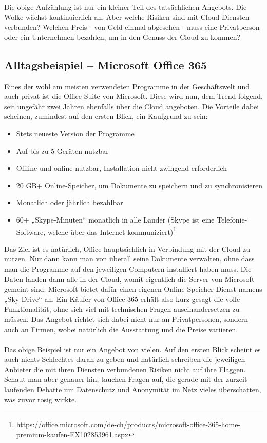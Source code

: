 Die obige Aufzählung ist nur ein kleiner Teil des tatsächlichen Angebots. Die Wolke wächst kontinuierlich an. Aber welche Risiken sind mit Cloud-Diensten verbunden? Welchen Preis - von Geld einmal abgesehen - muss eine Privatperson oder ein Unternehmen bezahlen, um in den Genuss der Cloud zu kommen?

\subsection{Alltagsbeispiel – Microsoft Office 365}
Eines der wohl am meisten verwendeten Programme in der Geschäftswelt und auch privat ist die Office Suite von Microsoft. Diese wird nun, dem Trend folgend, seit ungefähr zwei Jahren ebenfalls über die Cloud angeboten. Die Vorteile dabei scheinen, zumindest auf den ersten Blick, ein Kaufgrund zu sein:

\begin{itemize}
\item Stets neueste Version der Programme
\item Auf bis zu 5 Geräten nutzbar
\item Offline und online nutzbar, Installation nicht zwingend erforderlich
\item 20 GB+ Online-Speicher, um Dokumente zu speichern und zu synchronisieren
\item Monatlich oder jährlich bezahlbar
\item 60+ „Skype-Minuten“ monatlich in alle Länder (Skype ist eine Telefonie-Software, welche über das Internet kommuniziert)\footnote{\url{https://office.microsoft.com/de-ch/products/microsoft-office-365-home-premium-kaufen-FX102853961.aspx}}
\end{itemize}

Das Ziel ist es natürlich, Office hauptsächlich in Verbindung mit der Cloud zu nutzen. Nur dann kann man von überall seine Dokumente verwalten, ohne dass man die Programme auf den jeweiligen Computern installiert haben muss. Die Daten landen dann alle in der Cloud, womit eigentlich die Server von Microsoft gemeint sind. Microsoft bietet dafür einen eigenen Online-Speicher-Dienst namens „Sky-Drive“ an. Ein Käufer von Office 365 erhält also kurz gesagt die volle Funktionalität, ohne sich viel mit technischen Fragen auseinandersetzen zu müssen. Das Angebot richtet sich dabei nicht nur an Privatpersonen, sondern auch an Firmen, wobei natürlich die Ausstattung und die Preise variieren.
\\
\\
Das obige Beispiel ist nur ein Angebot von vielen. Auf den ersten Blick scheint es auch nichts Schlechtes daran zu geben und natürlich schreiben die jeweiligen Anbieter die mit ihren Diensten verbundenen Risiken nicht auf ihre Flaggen. Schaut man aber genauer hin, tauchen Fragen auf, die gerade mit der zurzeit laufenden Debatte um Datenschutz und Anonymität im Netz vieles überschatten, was zuvor rosig wirkte.

